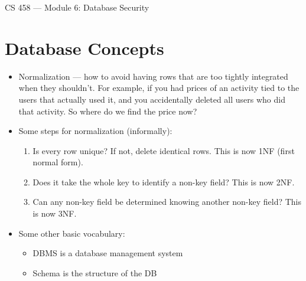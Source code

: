 \documentclass{article}
\author{Clement Tsang}
\begin{document}
\begin{center}
    \Large{CS 458 --- Module 6: Database Security}
\end{center}

\section{Database Concepts}
\begin{itemize}
    \item Normalization --- how to avoid having rows that are too tightly integrated when they shouldn't.  For example, if you had prices of an activity tied to the users that actually used it, and you accidentally deleted all users who did that activity.  So where do we find the price now?
    \item Some steps for normalization (informally):
        \begin{enumerate}
            \item Is every row unique?  If not, delete identical rows.  This is now 1NF (first normal form).
            \item Does it take the whole key to identify a non-key field?  This is now 2NF.
            \item Can any non-key field be determined knowing another non-key field?  This is now 3NF.
        \end{enumerate}
    \item Some other basic vocabulary:
        \begin{itemize}
            \item DBMS is a database management system
            \item Schema is the structure of the DB
        \end{itemize}
\end{itemize}
\end{document}
